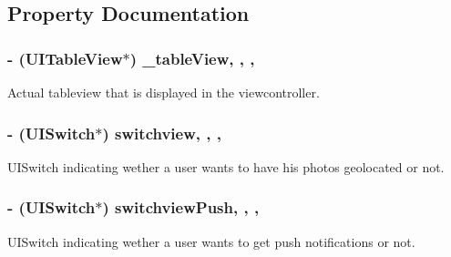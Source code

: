 \subsection{Property Documentation}
\hypertarget{interface_e_s_settings_view_controller_a9aa0e644ccdf077d393ddb21587c709f}{}
\subsubsection[{\+\_\+table\+View}]{\setlength{\rightskip}{0pt plus 5cm}-\/ (U\+I\+Table\+View$\ast$) \+\_\+table\+View\hspace{0.3cm}{\ttfamily [read]}, {\ttfamily [write]}, {\ttfamily [nonatomic]}, {\ttfamily [strong]}}\label{interface_e_s_settings_view_controller_a9aa0e644ccdf077d393ddb21587c709f}
Actual tableview that is displayed in the viewcontroller. \hypertarget{interface_e_s_settings_view_controller_a9d4ea83398ad29c745f6978112915031}{}
\subsubsection[{switchview}]{\setlength{\rightskip}{0pt plus 5cm}-\/ (U\+I\+Switch$\ast$) switchview\hspace{0.3cm}{\ttfamily [read]}, {\ttfamily [write]}, {\ttfamily [nonatomic]}, {\ttfamily [retain]}}\label{interface_e_s_settings_view_controller_a9d4ea83398ad29c745f6978112915031}
U\+I\+Switch indicating wether a user wants to have his photos geolocated or not. \hypertarget{interface_e_s_settings_view_controller_ac40e0b1b19946860c595d06c7d9785d4}{}
\subsubsection[{switchview\+Push}]{\setlength{\rightskip}{0pt plus 5cm}-\/ (U\+I\+Switch$\ast$) switchview\+Push\hspace{0.3cm}{\ttfamily [read]}, {\ttfamily [write]}, {\ttfamily [nonatomic]}, {\ttfamily [retain]}}\label{interface_e_s_settings_view_controller_ac40e0b1b19946860c595d06c7d9785d4}
U\+I\+Switch indicating wether a user wants to get push notifications or not. \hypertarget{interface_e_s_settings_view_controller_a58f2451a126bb78283fe7db9e55a4e6f}{}
